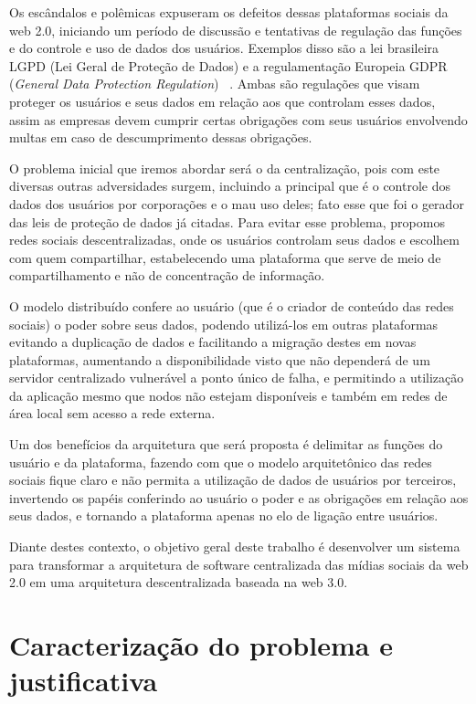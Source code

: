Os escândalos e polêmicas expuseram os defeitos dessas plataformas sociais da web 2.0, iniciando um período de discussão e tentativas de regulação das funções e do controle e uso de dados dos usuários.
Exemplos disso são a lei brasileira LGPD (Lei Geral de Proteção de Dados) e a regulamentação Europeia GDPR (\textit{General Data Protection Regulation})~\cite{LGPD1} \cite{GPDR1}.
Ambas são regulações que visam proteger os usuários e seus dados em relação aos que controlam esses dados, assim as empresas devem cumprir certas obrigações com seus usuários envolvendo multas em caso de descumprimento dessas obrigações.

O problema inicial que iremos abordar será o da centralização, pois com este diversas outras adversidades surgem, incluindo a principal que é o controle dos dados dos usuários por corporações e o mau uso deles; fato esse que foi o gerador das leis de proteção de dados já citadas.
Para evitar esse problema, propomos redes sociais descentralizadas, onde os usuários controlam seus dados e escolhem com quem compartilhar, estabelecendo uma plataforma que serve de meio de compartilhamento e não de concentração de informação.

O modelo distribuído confere ao usuário (que é o criador de conteúdo das redes sociais) o poder sobre seus dados, podendo utilizá-los em outras plataformas evitando a duplicação de dados e facilitando a migração destes em novas plataformas, aumentando a disponibilidade visto que não dependerá de um servidor centralizado vulnerável a  ponto único de falha, e permitindo a utilização da aplicação mesmo que nodos não estejam disponíveis e também em redes de área local sem acesso a rede externa.

Um dos benefícios da arquitetura que será proposta é delimitar as funções do usuário e da plataforma, fazendo com que o modelo arquitetônico das redes sociais fique claro e não permita a utilização de dados de usuários por terceiros, invertendo os papéis conferindo ao usuário o poder e as obrigações em relação aos seus dados, e tornando a plataforma apenas no elo de ligação entre usuários.

Diante destes contexto, o objetivo geral deste trabalho é desenvolver um sistema para transformar a arquitetura de software centralizada das mídias sociais da web 2.0 em uma arquitetura descentralizada baseada na web 3.0.

\chapter{Caracterização do problema e justificativa}

